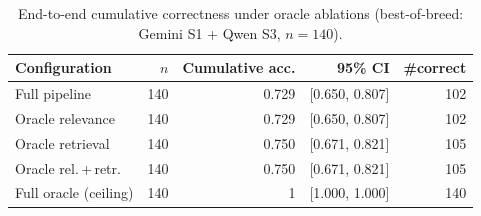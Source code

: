 \begin{table}[htbp]
  \centering
  \caption{End-to-end cumulative correctness under oracle ablations (best-of-breed: Gemini S1 + Qwen S3, $n=140$).}
  \label{tab:e2e-ablation}
  \begin{tabular}{lrrrr}
    \toprule
    Configuration & $n$ & Cumulative acc. & 95\% CI & \#correct \\
    \midrule
    Full pipeline & 140 & 0.729 & [0.650, 0.807] & 102 \\
    Oracle relevance & 140 & 0.729 & [0.650, 0.807] & 102 \\
    Oracle retrieval & 140 & 0.750 & [0.671, 0.821] & 105 \\
    Oracle rel.\,+\,retr. & 140 & 0.750 & [0.671, 0.821] & 105 \\
    Full oracle (ceiling) & 140 & 1 & [1.000, 1.000] & 140 \\
    \bottomrule
  \end{tabular}
\end{table}
